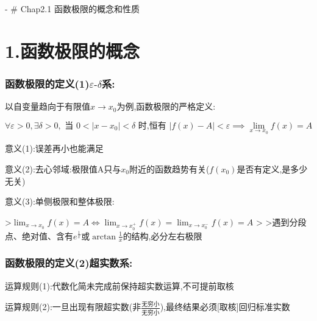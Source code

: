 \documentclass[11pt,a4paper,UTF8]{ctexart}
\begin{document}
\pagestyle{fancy}
\fancyhf{}
\fancyhead[R]{\small\color{TitlePurple}\nouppercase{\leftmark}}
\renewcommand{\headrulewidth}{0.5pt}

\tableofcontents
\newpage
{}

- \# Chap2.1 函数极限的概念和性质


\section{1.函数极限的概念}


\subsubsection{函数极限的定义(1)$\varepsilon\text{-}\delta$系:}

    以自变量趋向于有限值$x \to x_0$为例,函数极限的严格定义:


\begin{equation*}
\forall \varepsilon > 0, \exists \delta > 0, \text{ 当 } 0 < \vert{}x - x_0\vert{} < \delta \text{ 时,恒有 } \vert{}f(x) - A\vert{} < \varepsilon \implies \lim_{x \to x_0} f(x) = A
\end{equation*}

    意义(1):误差再小也能满足

    意义(2):去心邻域:极限值A只与$x_0$附近的函数趋势有关($f(x_0)$是否有定义,是多少无关)

    意义(3):单侧极限和整体极限:

\begin{solbox}[{分步推导与答题规范}]
    >$\lim_{x \to x_0} f(x) = A \iff \lim_{x \to x_0^+} f(x) = \lim_{x \to x_0^-} f(x) = A$
    >
    >遇到分段点、绝对值、含有$e^{\frac{1}{x}}$或$\arctan \frac{1}{x}$的结构,必分左右极限
\end{solbox}


\subsubsection{函数极限的定义(2)超实数系:}

    运算规则(1):代数化简未完成前保持超实数运算,不可提前取核

    运算规则(2):一旦出现有限超实数(非$\frac{\text{无穷小}}{\text{无穷小}}$),最终结果必须[取核]回归标准实数
\end{document}
